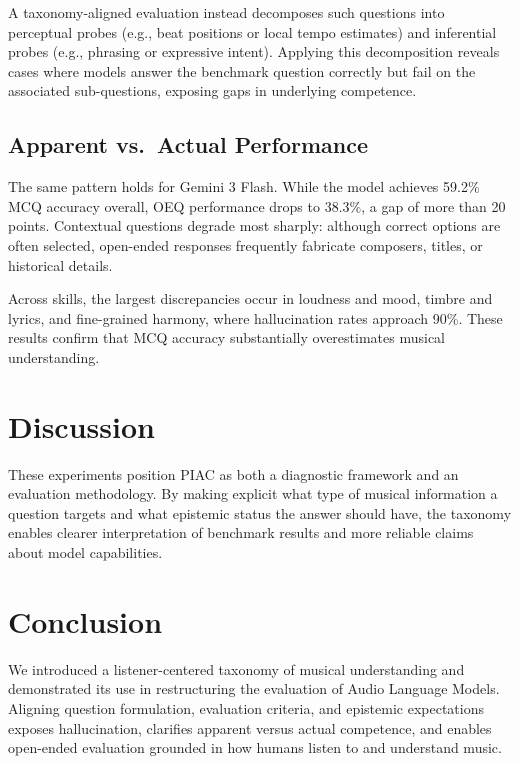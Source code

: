 \documentclass[conference,a4paper]{APSIPA2026}
\begin{document}
A taxonomy-aligned evaluation instead decomposes such questions into perceptual probes (e.g., beat positions or local tempo estimates) and inferential probes (e.g., phrasing or expressive intent). Applying this decomposition reveals cases where models answer the benchmark question correctly but fail on the associated sub-questions, exposing gaps in underlying competence.

\subsection{Apparent vs.\ Actual Performance}

The same pattern holds for Gemini 3 Flash. While the model achieves 59.2\% MCQ accuracy overall, OEQ performance drops to 38.3\%, a gap of more than 20 points. Contextual questions degrade most sharply: although correct options are often selected, open-ended responses frequently fabricate composers, titles, or historical details.

Across skills, the largest discrepancies occur in loudness and mood, timbre and lyrics, and fine-grained harmony, where hallucination rates approach 90\%. These results confirm that MCQ accuracy substantially overestimates musical understanding.

\section{Discussion}

These experiments position PIAC as both a diagnostic framework and an evaluation methodology. By making explicit what type of musical information a question targets and what epistemic status the answer should have, the taxonomy enables clearer interpretation of benchmark results and more reliable claims about model capabilities.

\section{Conclusion}

We introduced a listener-centered taxonomy of musical understanding and demonstrated its use in restructuring the evaluation of Audio Language Models. Aligning question formulation, evaluation criteria, and epistemic expectations exposes hallucination, clarifies apparent versus actual competence, and enables open-ended evaluation grounded in how humans listen to and understand music.
\end{document}

